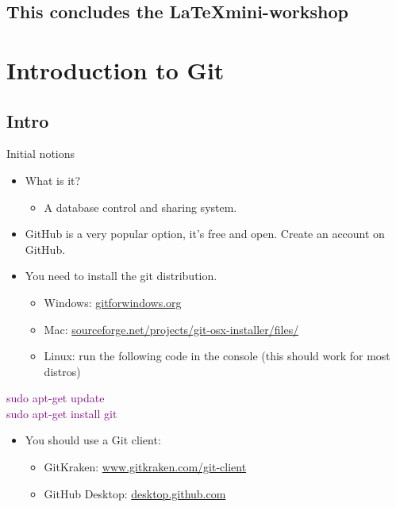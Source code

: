 \documentclass[usenames,dvipsnames,aspectratio=169]{beamer}
\newcommand{\aitem}{\item[$\cdot$]}
\newcommand{\bitem}{\item[-]}
\begin{document}
\subsection{This concludes the \LaTeX mini-workshop}

\section{Introduction to Git}
\subsection{Intro}
\begin{frame}[t]{Initial notions}
\begin{itemize}
\aitem What is it?
\begin{itemize}
\bitem A database control and sharing system.
\end{itemize}
\aitem GitHub is a very popular option, it's free and open. Create an account on GitHub.
\aitem You need to install the git distribution.
\begin{itemize}
\bitem Windows: \textcolor{blue}{\url{gitforwindows.org}}
\bitem Mac: \textcolor{blue}{\url{sourceforge.net/projects/git-osx-installer/files/}}
\bitem Linux: run the following code in the console (this should work for most distros)
\end{itemize}
\end{itemize}
\textcolor{purple}{
sudo apt-get update\\
sudo apt-get install git}
\begin{itemize}
\aitem You should use a Git client:
\begin{itemize}
\bitem GitKraken: \textcolor{blue}{\url{www.gitkraken.com/git-client}}
\bitem GitHub Desktop: \textcolor{blue}{\url{desktop.github.com}}
\end{itemize}
\end{itemize}
\end{frame}

\end{document}
